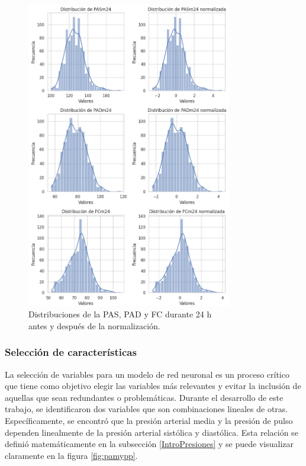 \begin{figure}[H]
	\centering
	\includegraphics[width=0.8\textwidth]{./Figures/normalizacion.png}
	\caption{Distribuciones de la PAS, PAD y FC durante 24 h \\antes y después de la normalización.}\label{fig:normalizacion}
\end{figure}

\subsubsection{Selección de características}

La selección de variables para un modelo de red neuronal es un proceso crítico que tiene como objetivo 
elegir las variables más relevantes y evitar la inclusión de aquellas que sean redundantes o 
problemáticas. Durante el desarrollo de este trabajo, se identificaron dos variables que son 
combinaciones lineales de otras. Específicamente, se encontró que la presión arterial media y 
la presión de pulso dependen linealmente de la presión arterial sistólica y diastólica. 
Esta relación se definió matemáticamente en la subsección \ref{IntroPresiones} y 
se puede visualizar claramente en la figura \ref{fig:pamypp}. 

